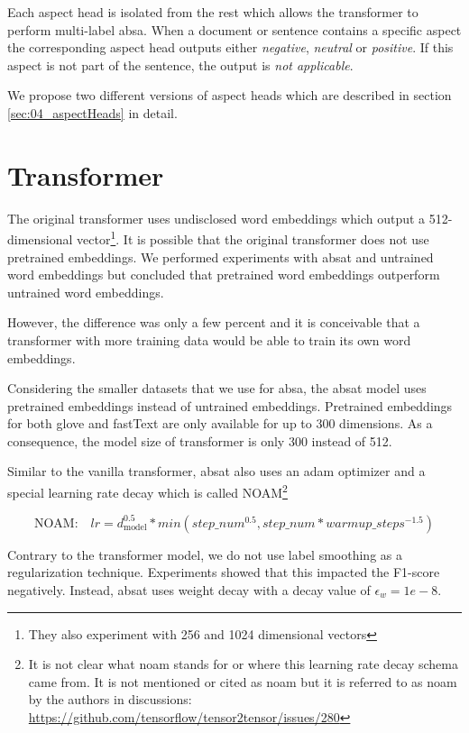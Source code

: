 Each aspect head is isolated from the rest which allows the transformer to perform multi-label \gls{absa}. When a document or sentence contains a specific aspect the corresponding aspect head outputs either \textit{negative}, \textit{neutral} or \textit{positive}. If this aspect is not part of the sentence, the output is \textit{not applicable}.

We propose two different versions of aspect heads which are described in section \ref{sec:04_aspectHeads} in detail.

\section{Transformer}
\label{sec:04_transformer}

The original transformer uses undisclosed word embeddings which output a 512-dimensional vector\footnote{They also experiment with 256 and 1024 dimensional vectors}. It is possible that the original transformer does not use pretrained embeddings. We performed experiments with \gls{absat} and untrained word embeddings but concluded that pretrained word embeddings outperform untrained word embeddings. 

However, the difference was only a few percent and it is conceivable that a transformer with more training data would be able to train its own word embeddings.
\medskip

Considering the smaller datasets that we use for \gls{absa}, the \gls{absat} model uses pretrained embeddings instead of untrained embeddings. Pretrained embeddings for both \gls{glove} and fastText are only available for up to 300 dimensions. As a consequence, the model size of transformer is only 300 instead of 512.
\bigskip

Similar to the vanilla transformer, \gls{absat} also uses an \gls{adam} optimizer \cite{Kingma2014} and a special learning rate decay which is called NOAM\footnote{It is not clear what noam stands for or where this learning rate decay schema came from. It is not mentioned or cited as noam but it is referred to as noam by the authors in discussions: \url{https://github.com/tensorflow/tensor2tensor/issues/280}} \cite{Vaswani2017}

\begin{equation}
	\text{NOAM:} \quad lr = d_\text{model}^{0.5} * min(step\_num^{0.5}, step\_num*warmup\_steps^{-1.5})
\end{equation}
 
Contrary to the transformer model, we do not use label smoothing as a regularization technique. Experiments showed that this impacted the F1-score negatively. Instead, \gls{absat} uses weight decay with a decay value of $\epsilon_w = 1e-8$.


